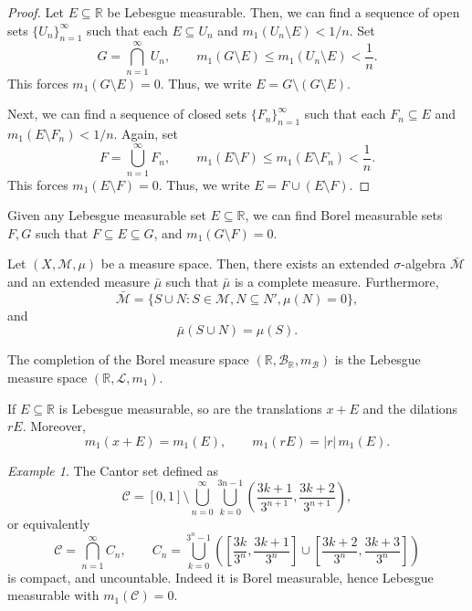 \documentclass[11pt]{article}
\newcommand{\R}{\mathbb{R}}
\newcommand{\M}{\mathcal{M}}
\renewcommand{\L}{\mathcal{L}}
\theoremstyle{definition}
\theoremstyle{remark}
\newtheorem*{example}{Example}
\numberwithin{equation}{section}
\begin{document}
    \begin{proof}
        Let $E \subseteq \R$ be Lebesgue measurable. Then, we can find a sequence of
        open sets $\{U_n\}_{n = 1}^\infty$ such that each $E \subseteq U_n$ and
        $m_1(U_n\setminus E) < 1 / n$. Set \[
            G = \bigcap_{n = 1}^\infty U_n, \qquad
            m_1(G\setminus E) \leq m_1(U_n\setminus E) < \frac{1}{n}.
        \] This forces $m_1(G\setminus E) = 0$. Thus, we write $E = G \setminus
        (G\setminus E)$.

        Next, we can find a sequence of closed sets $\{F_n\}_{n = 1}^\infty$ such
        that each $F_n \subseteq E$ and $m_1(E\setminus F_n) < 1 / n$. Again, set \[
            F = \bigcup_{n = 1}^\infty F_n, \qquad
            m_1(E\setminus F) \leq m_1(E\setminus F_n) < \frac{1}{n}.
        \] This forces $m_1(E\setminus F) = 0$. Thus, we write $E = F\cup(E\setminus
        F)$.
    \end{proof}

    \begin{corollary}
        Given any Lebesgue measurable set $E \subseteq \R$, we can find Borel
        measurable sets $F, G$ such that $F \subseteq E \subseteq G$, and
        $m_1(G\setminus F) = 0$.
    \end{corollary}

    \begin{theorem}
        Let $(X, \M, \mu)$ be a measure space. Then, there exists an extended
        $\sigma$-algebra $\bar{\M}$ and an extended measure $\bar{\mu}$ such that
        $\bar{\mu}$ is a complete measure. Furthermore, \[
            \bar{\M} = \{S \cup N : S \in \M, N \subseteq N', \mu(N) = 0\},
        \] and \[
            \bar{\mu}(S \cup N) = \mu(S).
        \]
    \end{theorem}

    \begin{theorem}
        The completion of the Borel measure space $(\R, \mathcal{B}_\R,
        m_\mathcal{B})$ is the Lebesgue measure space $(\R, \L, m_1)$.
    \end{theorem}


    \begin{lemma}
        If $E \subseteq \R$ is Lebesgue measurable, so are the translations $x + E$
        and the dilations $rE$. Moreover, \[
            m_1(x + E) = m_1(E), \qquad
            m_1(rE) = |r|\,m_1(E).
        \]
    \end{lemma}

    \begin{example}
        The Cantor set defined as \[
            \mathcal{C} = [0, 1]\setminus \bigcup_{n = 0}^\infty \bigcup_{k = 0}^{3n
            - 1} \left(\frac{3k + 1}{3^{n + 1}}, \frac{3k + 2}{3^{n + 1}}\right),
        \] or equivalently \[
            \mathcal{C} = \bigcap_{n = 1}^\infty C_n, \qquad
            C_n = \bigcup_{k = 0}^{3^n - 1}\left(\left[\frac{3k}{3^n}, \frac{3k +
            1}{3^n}\right] \cup \left[\frac{3k + 2}{3^n}, \frac{3k +
            3}{3^n}\right]\right)
        \] is compact, and uncountable. Indeed it is Borel measurable, hence Lebesgue
        measurable with $m_1(\mathcal{C}) = 0$.
    \end{example}
\end{document}
